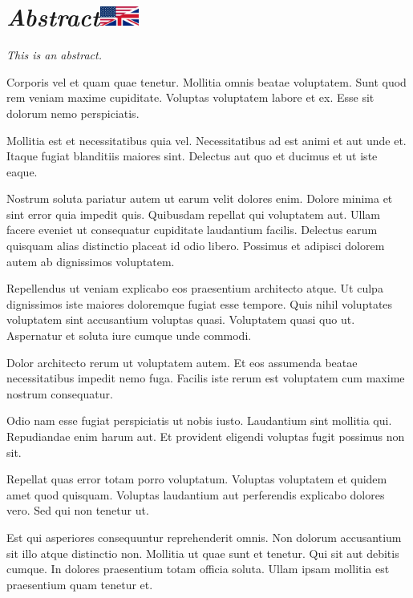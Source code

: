 \chapter[Résumé (anglais)]{\itshape Abstract\hspace{2em}\includegraphics[height=18pt]{Front/Figures/US-UK_flag.pdf}}

{\itshape
This is an abstract.

Corporis vel et quam quae tenetur. Mollitia omnis beatae voluptatem. Sunt quod rem veniam maxime cupiditate. Voluptas voluptatem labore et ex. Esse sit dolorum nemo perspiciatis.

Mollitia est et necessitatibus quia vel. Necessitatibus ad est animi et aut unde et. Itaque fugiat blanditiis maiores sint. Delectus aut quo et ducimus et ut iste eaque.

Nostrum soluta pariatur autem ut earum velit dolores enim. Dolore minima et sint error quia impedit quis. Quibusdam repellat qui voluptatem aut. Ullam facere eveniet ut consequatur cupiditate laudantium facilis. Delectus earum quisquam alias distinctio placeat id odio libero. Possimus et adipisci dolorem autem ab dignissimos voluptatem.

Repellendus ut veniam explicabo eos praesentium architecto atque. Ut culpa dignissimos iste maiores doloremque fugiat esse tempore. Quis nihil voluptates voluptatem sint accusantium voluptas quasi. Voluptatem quasi quo ut. Aspernatur et soluta iure cumque unde commodi.

Dolor architecto rerum ut voluptatem autem. Et eos assumenda beatae necessitatibus impedit nemo fuga. Facilis iste rerum est voluptatem cum maxime nostrum consequatur.

Odio nam esse fugiat perspiciatis ut nobis iusto. Laudantium sint mollitia qui. Repudiandae enim harum aut. Et provident eligendi voluptas fugit possimus non sit.

Repellat quas error totam porro voluptatum. Voluptas voluptatem et quidem amet quod quisquam. Voluptas laudantium aut perferendis explicabo dolores vero. Sed qui non tenetur ut.

Est qui asperiores consequuntur reprehenderit omnis. Non dolorum accusantium sit illo atque distinctio non. Mollitia ut quae sunt et tenetur. Qui sit aut debitis cumque. In dolores praesentium totam officia soluta. Ullam ipsam mollitia est praesentium quam tenetur et.
}
